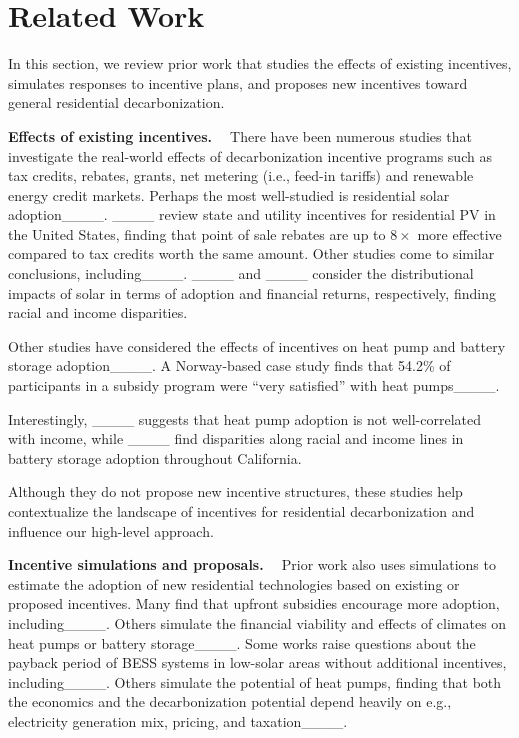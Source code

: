 \section{Related Work}
\label{sec:relwork}
In this section, we review prior work that studies the effects of existing incentives, simulates responses to incentive plans, and proposes new incentives toward general residential decarbonization. 

\noindent\textbf{Effects of existing incentives. \ }
There have been numerous studies that investigate the real-world effects of decarbonization incentive programs such as tax credits, rebates, grants, net metering (i.e., feed-in tariffs) and renewable energy credit markets. Perhaps the most well-studied is residential solar adoption____.  ____ review state and utility incentives for residential PV in the United States, finding that point of sale rebates are up to $8\times$ more effective compared to tax credits worth the same amount.  Other studies come to similar conclusions, including____.  ____ and ____ consider the distributional impacts of solar in terms of adoption and financial returns, respectively, finding racial and income disparities.

Other studies have considered the effects of incentives on heat pump and battery storage adoption____. A Norway-based case study finds that 54.2\% of participants in a subsidy program were ``very satisfied'' with heat pumps____. 

Interestingly, ____ suggests that heat pump adoption is not well-correlated with income, while ____ find disparities along racial and income lines in battery storage adoption throughout California. 

Although they do not propose new incentive structures, these studies help contextualize the landscape of incentives for residential decarbonization  and influence our high-level approach.



\noindent\textbf{Incentive simulations and proposals. \ }
Prior work also uses simulations to estimate the adoption of new residential technologies based on existing or proposed incentives.  Many find that upfront subsidies encourage more adoption, including____.  Others simulate the financial viability and effects of climates on heat pumps or battery storage____.  Some works raise questions about the payback period of BESS systems in low-solar areas without additional incentives, including____.  Others simulate the potential of heat pumps, finding that both the economics and the decarbonization potential depend heavily on e.g., electricity generation mix, pricing, and taxation____.  


